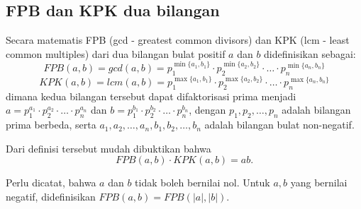 \subsection{FPB dan KPK dua bilangan}
Secara matematis FPB (gcd - greatest common divisors) dan KPK (lcm - least common multiples) dari dua bilangan bulat positif $a$ dan $b$ 
didefinisikan sebagai:
$$FPB(a,b) = gcd(a,b) = p_1^{\min\{a_1,b_1\}}\cdot p_2^{\min\{a_2,b_2\}} \cdot \ldots \cdot p_n^{\min\{a_n,b_n\}}$$
$$KPK(a,b) = lcm(a,b) =p_1^{\max\{a_1,b_1\}}\cdot p_2^{\max\{a_2,b_2\}} \cdot \ldots \cdot p_n^{\max\{a_n,b_n\}}$$
dimana kedua bilangan tersebut dapat difaktorisasi prima menjadi
$a=p_1^{a_1}\cdot p_2^{a_2}\cdot \ldots \cdot p_n^{a_n}$ dan $b=p_1^{b_1}\cdot p_2^{b_2} \cdot \ldots \cdot p_n^{b_n}$, dengan $p_1,p_2,\dots,p_n$ adalah bilangan prima berbeda, serta $a_1,a_2,\dots,a_n,b_1,b_2,\dots,b_n$ adalah bilangan bulat non-negatif.

Dari definisi tersebut mudah dibuktikan bahwa
$$FPB(a,b) \cdot KPK(a,b) = ab.$$

Perlu dicatat, bahwa $a$ dan $b$ tidak boleh bernilai nol. Untuk $a,b$ yang bernilai negatif, didefinisikan $FPB(a,b) = FPB(|a|,|b|)$.


